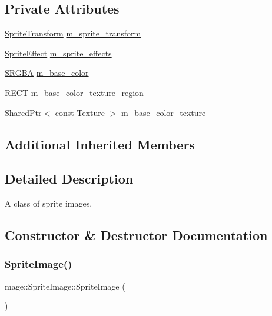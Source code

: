 \subsection*{Private Attributes}
\begin{DoxyCompactItemize}
\item 
\hyperlink{classmage_1_1_sprite_transform}{Sprite\+Transform} \hyperlink{classmage_1_1_sprite_image_aee2dc3f28e26692066fe791b71012929}{m\+\_\+sprite\+\_\+transform}
\item 
\hyperlink{namespacemage_a9cfe18123066ba4236f548f9de75d881}{Sprite\+Effect} \hyperlink{classmage_1_1_sprite_image_acec094202967688a6e368eb44e5950ba}{m\+\_\+sprite\+\_\+effects}
\item 
\hyperlink{structmage_1_1_s_r_g_b_a}{S\+R\+G\+BA} \hyperlink{classmage_1_1_sprite_image_aa83cc38aa8a84e8fc434232b4223c236}{m\+\_\+base\+\_\+color}
\item 
R\+E\+CT \hyperlink{classmage_1_1_sprite_image_a27540b0bee5970d2e978270fe20017ab}{m\+\_\+base\+\_\+color\+\_\+texture\+\_\+region}
\item 
\hyperlink{namespacemage_a1e01ae66713838a7a67d30e44c67703e}{Shared\+Ptr}$<$ const \hyperlink{classmage_1_1_texture}{Texture} $>$ \hyperlink{classmage_1_1_sprite_image_a92f5b052561ca7d8fb317b8479d820a2}{m\+\_\+base\+\_\+color\+\_\+texture}
\end{DoxyCompactItemize}
\subsection*{Additional Inherited Members}


\subsection{Detailed Description}
A class of sprite images. 

\subsection{Constructor \& Destructor Documentation}
\hypertarget{classmage_1_1_sprite_image_aee1a41099068c4037f29e98b7c5d84ae}{}\label{classmage_1_1_sprite_image_aee1a41099068c4037f29e98b7c5d84ae} 
\subsubsection{\texorpdfstring{Sprite\+Image()}{SpriteImage()}\hspace{0.1cm}{\footnotesize\ttfamily [1/3]}}
{\footnotesize\ttfamily mage\+::\+Sprite\+Image\+::\+Sprite\+Image (\begin{DoxyParamCaption}{ }\end{DoxyParamCaption})\hspace{0.3cm}{\ttfamily [noexcept]}}


